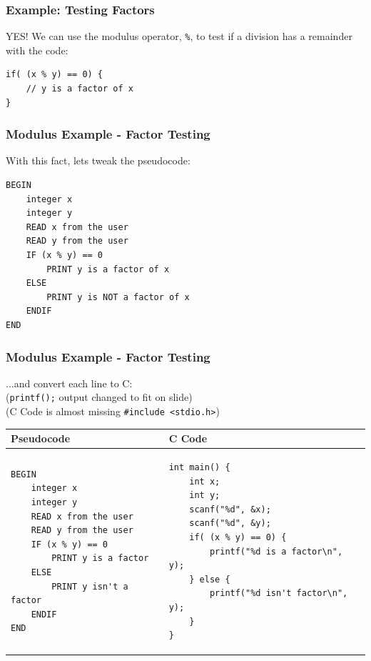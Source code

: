 \documentclass[14pt]{beamer}
\begin{document}
\begin{frame}[fragile]
\frametitle{Example: Testing Factors}
YES! We can use the modulus operator, \texttt{\%}, to test if a division has a remainder with the code:

\begin{lstlisting}[style=CStyle]
if( (x % y) == 0) {
	// y is a factor of x
}
\end{lstlisting}

\end{frame}

\begin{frame}[fragile]
\frametitle{Modulus Example - Factor Testing}
With this fact, lets tweak the pseudocode:
\begin{lstlisting}[style=pseudo]
BEGIN
	integer x
	integer y
	READ x from the user
	READ y from the user
	IF (x % y) == 0
		PRINT y is a factor of x
	ELSE
		PRINT y is NOT a factor of x
	ENDIF
END
\end{lstlisting}
\end{frame}

\begin{frame}[fragile]
\frametitle{Modulus Example - Factor Testing}
...and convert each line to C:\\
\vspace{4mm}
\small{(\texttt{printf();} output changed to fit on slide)}\\
\small{(C Code is almost missing \texttt{\#include <stdio.h>})}
\vspace{-2mm}
\begin{table}[H]
\centering

\begin{tabular}{ll}
Pseudocode & C Code \\
\hline

\begin{lstlisting}[style=pseudo,basicstyle=\ttfamily\scriptsize]
BEGIN
	integer x
	integer y
	READ x from the user
	READ y from the user
	IF (x % y) == 0
		PRINT y is a factor
	ELSE
		PRINT y isn't a factor
	ENDIF
END
\end{lstlisting} &

\begin{lstlisting}[style=Ctable,basicstyle=\ttfamily\scriptsize]
int main() {
	int x;
	int y;
	scanf("%d", &x);
	scanf("%d", &y);
	if( (x % y) == 0) {
		printf("%d is a factor\n", y);
	} else {
		printf("%d isn't factor\n", y);
	}
}
\end{lstlisting}
\\

\hline
\end{tabular}
\end{table}

\end{frame}
\end{document}
